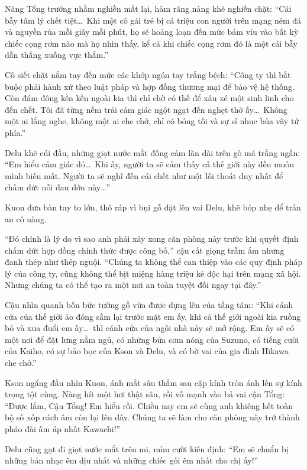 ﻿\documentclass[../main.tex]{subfiles}
\begin{document}
Nàng Tổng trưởng nhắm nghiền mắt lại, hàm răng nàng khẽ nghiến chặt: ``Cái bẫy tâm lý chết tiệt\dots\ Khi một cô gái trẻ bị cả triệu con người trên mạng ném đá và nguyền rủa mỗi giây mỗi phút, họ sẽ hoảng loạn đến mức bám víu vào bất kỳ chiếc cọng rơm nào mà họ nhìn thấy, kể cả khi chiếc cọng rơm đó là một cái bẫy dẫn thẳng xuống vực thẳm.''

Cô siết chặt nắm tay đến mức các khớp ngón tay trắng bệch: ``Công ty thì bắt buộc phải hành xử theo luật pháp và hợp đồng thương mại để bảo vệ hệ thống. Còn đám đông kền kền ngoài kia thì chỉ chờ có thế để xâu xé một sinh linh cho đến chết. Tôi đã từng nếm trải cảm giác ngột ngạt đến nghẹt thở ấy\dots\ Không một ai lắng nghe, không một ai che chở, chỉ có bóng tối và sự sỉ nhục bủa vây tứ phía.''

Delu khẽ cúi đầu, những giọt nước mắt đồng cảm lăn dài trên gò má trắng ngần: ``Em hiểu cảm giác đó\dots\ Khi ấy, người ta sẽ cảm thấy cả thế giới này đều muốn mình biến mất. Người ta sẽ nghĩ đến cái chết như một lối thoát duy nhất để chấm dứt nỗi đau đớn này\dots''

Kuon đưa bàn tay to lớn, thô ráp vì bụi gỗ đặt lên vai Delu, khẽ bóp nhẹ để trấn an cô nàng.

``Đó chính là lý do vì sao anh phải xây xong căn phòng này trước khi quyết định chấm dứt hợp đồng chính thức được công bố,'' cậu cất giọng trầm ấm nhưng đanh thép như thép nguội. ``Chúng ta không thể can thiệp vào các quy định pháp lý của công ty, cũng không thể bịt miệng hàng triệu kẻ độc hại trên mạng xã hội. Nhưng chúng ta có thể tạo ra một nơi an toàn tuyệt đối ngay tại đây.''

Cậu nhìn quanh bốn bức tường gỗ vừa được dựng lên của tầng tám: ``Khi cánh cửa của thế giới ảo đóng sầm lại trước mặt em ấy, khi cả thế giới ngoài kia ruồng bỏ và xua đuổi em ấy\dots\ thì cánh cửa của ngôi nhà này sẽ mở rộng. Em ấy sẽ có một nơi để đặt lưng nằm ngủ, có những bữa cơm nóng của Suzuno, có tiếng cười của Kaiho, có sự bảo bọc của Kson và Delu, và có bờ vai của gia đình Hikawa che chở.''

Kson ngẩng đầu nhìn Kuon, ánh mắt sâu thẳm sau cặp kính tròn ánh lên sự kính trọng tột cùng. Nàng hít một hơi thật sâu, rồi vỗ mạnh vào bả vai cậu Tổng: ``Được lắm, Cậu Tổng! Em hiểu rồi. Chiều nay em sẽ cùng anh khiêng hết toàn bộ số xốp cách âm còn lại lên đây. Chúng ta sẽ làm cho căn phòng này trở thành pháo đài ấm áp nhất Kawachi!''

Delu cũng gạt đi giọt nước mắt trên mi, mỉm cười kiên định: ``Em sẽ chuẩn bị những bản nhạc êm dịu nhất và những chiếc gối êm nhất cho chị ấy!''
\end{document}
